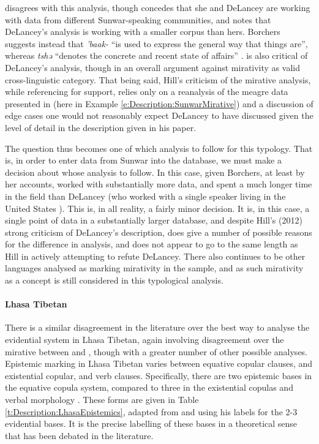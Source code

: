  disagrees with this analysis, though concedes that she and DeLancey are working with data from different Sunwar-speaking communities, and notes that DeLancey's analysis is working with a smaller corpus than hers. Borchers suggests instead that \textit{'baak-} ``is used to express the general way that things are'', whereas \textit{tshə} ``denotes the concrete and recent state of affairs'' \cite[164]{Borchers2008}.  is also critical of DeLancey's analysis, though in an overall argument against mirativity as valid cross-linguistic category. That being said, Hill's criticism of the mirative analysis, while referencing  for support, relies only on a reanalysis of the meagre data presented in  (here in Example \ref{e:Description:SunwarMirative}) and a discussion of edge cases one would not reasonably expect DeLancey to have discussed given the level of detail in the description given in his paper.

The question thus becomes one of which analysis to follow for this typology. That is, in order to enter data from Sunwar into the database, we must make a decision about whose analysis to follow. In this case, given Borchers, at least by her accounts, worked with substantially more data, and spent a much longer time in the field than DeLancey (who worked with a single speaker living in the United States \cite{DeLanceyMirativity1997}). This is, in all reality, a fairly minor decision. It is, in this case, a single point of data in a substantially larger database, and despite Hill's (2012) strong criticism of DeLancey's description,  does give a number of possible reasons for the difference in analysis, and does not appear to go to the same length as Hill in actively attempting to refute DeLancey. There also continues to be other languages analysed as marking mirativity in the sample, and as such mirativity as a concept is still considered in this typological analysis.

\paragraph{Lhasa Tibetan}
There is a similar disagreement in the literature over the best way to analyse the evidential system in Lhasa Tibetan, again involving disagreement over the mirative between  and , though with a greater number of other possible analyses. Epistemic marking in Lhasa Tibetan varies between equative copular clauses, and existential copular, and verb clauses. Specifically, there are two epistemic bases in the equative copula system, compared to three in the existential copulas and verbal morphology \cite{DeLancey2017Tibetan}. These forms are given in Table \ref{t:Description:LhasaEpistemics}, adapted from  and using his labels for the 2-3 evidential bases. It is the precise labelling of these bases in a theoretical sense that has been debated in the literature.

